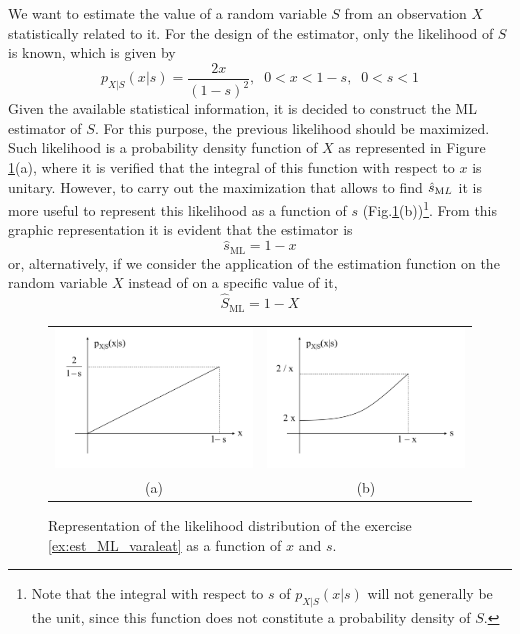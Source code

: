 \begin{example}[Estimation ML]
\label{ex:est_ML_varaleat}
We want to estimate the value of a random variable $S$ from an observation $X$ statistically related to it. For the design of the estimator, only the likelihood of $S$ is known, which is given by
\begin{equation}
p_{X|S}(x|s) = \frac{2 x}{(1 - s)^2},\;\; 0<x<1-s,\;\; 0<s<1
\end{equation}
Given the available statistical information, it is decided to construct the ML estimator of $S$. For this purpose, the previous likelihood should be maximized. Such likelihood is a probability density function of $X$ as represented in Figure \ref{fig:est_ML_caso1}(a), where it is verified that the integral of this function with respect to $x$ is unitary. However, to carry out the maximization that allows to find $\hat s_{\text ML}$ it is more useful to represent this likelihood as a function of $s$ (Fig.\ref{fig:est_ML_caso1}(b))\footnote{Note that the integral with respect to $s$ of $p_{X|S}(x|s)$ will not generally be the unit, since this function does not constitute a probability density of $S$.}. From this graphic representation it is evident that the estimator is
$$\hat s_{\text{ML}} = 1 - x$$
or, alternatively, if we consider the application of the estimation function on the random variable $X$ instead of on a specific value of it,
$$\hat S_{\text{ML}} = 1 - X$$

\begin{figure}[t]
  \begin{center}
  \begin{tabular}{cc}
    \includegraphics[width=6cm]{Figures//px_s_funcionx.png} &
   
   \includegraphics[width=6cm]{Figures//px_s_funcions.png}\\
    (a) & (b)
  \end{tabular}
    \caption{Representation of the likelihood distribution of the exercise \ref{ex:est_ML_varaleat} as a function of $x$ and $s$.}
    \label{fig:est_ML_caso1}
  \end{center}
\end{figure}


\end{example}
